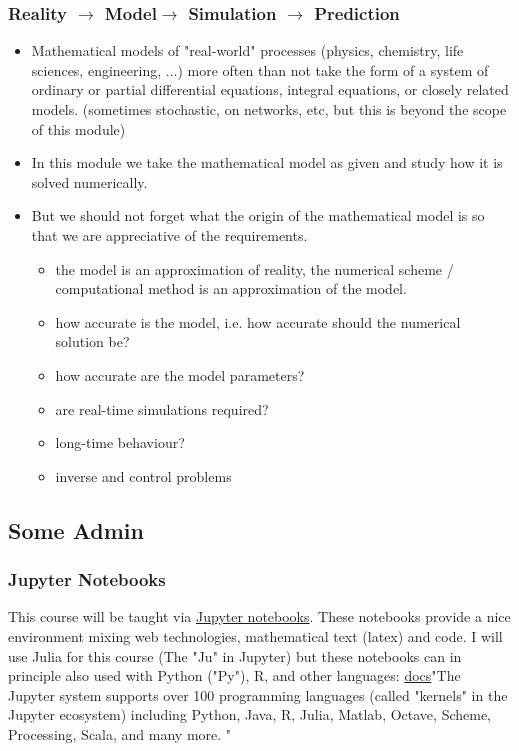 \documentclass[12pt,a4paper]{article}
\begin{document}
\subsubsection{Reality $\rightarrow$ Model$\rightarrow$ Simulation $\rightarrow$ Prediction}
\begin{itemize}
\item Mathematical models of "real-world" processes (physics, chemistry, life sciences, engineering, ...) more often than not take the form of a system of ordinary or partial differential equations, integral equations, or closely related models. (sometimes stochastic, on networks, etc, but this is beyond the scope of this module) 


\item In this module we take the mathematical model as given and study how it is solved numerically.


\item But we should not forget what the origin of the mathematical model is so that we are appreciative of the requirements. 

\begin{itemize}
\item the model is an approximation of reality, the numerical scheme / computational method is an approximation of the model.


\item how accurate is the model, i.e. how accurate should the numerical solution be? 


\item how accurate are the model parameters? 


\item are real-time simulations required?


\item long-time behaviour? 


\item inverse and control problems

\end{itemize}
\end{itemize}
\subsection{Some Admin}
\subsubsection{Jupyter Notebooks}
This course will be taught via \href{https://jupyter.org}{Jupyter notebooks}. These notebooks provide a nice environment mixing web technologies, mathematical text (latex) and code. I will use Julia for this course (The "Ju" in Jupyter) but these notebooks can in principle also used with Python ("Py"), R, and other languages:  \href{https://jupyter4edu.github.io/jupyter-edu-book/jupyter.html#language-support-kernels}{docs}"The Jupyter system supports over 100 programming languages (called "kernels" in the Jupyter ecosystem) including Python, Java, R, Julia, Matlab, Octave, Scheme, Processing, Scala, and many more. "
\end{document}
